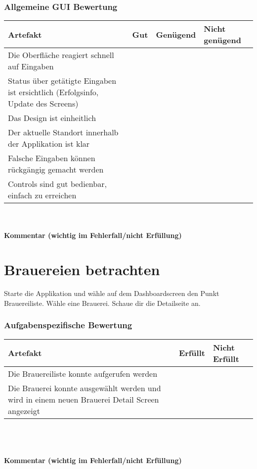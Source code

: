 \documentclass[10pt,a4paper]{scrartcl}
\begin{document}
\subsubsection*{Allgemeine GUI Bewertung}
\begin{tabular}{|p{}|p{}|p{}|p{}|}
\hline 
\rule[-1ex]{0pt}{2.5ex} \textbf{Artefakt} & \textbf{Gut} & \textbf{Genügend} & \textbf{Nicht genügend} \\ 
\hline 
\rule[-1ex]{0pt}{2.5ex} Die Oberfläche reagiert schnell auf Eingaben &  &  &  \\ 
\hline 
\rule[-1ex]{0pt}{2.5ex} Status über getätigte Eingaben ist ersichtlich (Erfolgsinfo, Update des Screens) &  &  &  \\ 
\hline 
\rule[-1ex]{0pt}{2.5ex} Das Design ist einheitlich &  &  &  \\ 
\hline 
\rule[-1ex]{0pt}{2.5ex} Der aktuelle Standort innerhalb der Applikation ist klar &  &  &  \\ 
\hline 
\rule[-1ex]{0pt}{2.5ex} Falsche Eingaben können rückgängig gemacht werden &  &  &  \\ 
\hline 
\rule[-1ex]{0pt}{2.5ex} Controls sind gut bedienbar, einfach zu erreichen &  &  &  \\  
\hline 
\end{tabular} 
\\
\\
\textbf{Kommentar (wichtig im Fehlerfall/nicht Erfüllung)}
\vspace*{3cm}


\section{Brauereien betrachten}
Starte die Applikation und wähle auf dem Dashboardscreen den Punkt Brauereiliste. Wähle eine
Brauerei. Schaue dir die Detailseite an.

\subsubsection*{Aufgabenspezifische Bewertung}
\begin{tabular}{|p{}|p{}|p{}|}
\hline 
\textbf{Artefakt} & \textbf{Erfüllt} & \textbf{Nicht Erfüllt} \\ 
\hline 
Die Brauereiliste konnte aufgerufen werden &  &  \\ 
\hline 
Die Brauerei konnte ausgewählt werden und wird in einem neuen Brauerei Detail Screen angezeigt &  &  \\ 
\hline 
\end{tabular}
\\
\\
\\
\textbf{Kommentar (wichtig im Fehlerfall/nicht Erfüllung)}
\vspace*{3cm}
\end{document}
